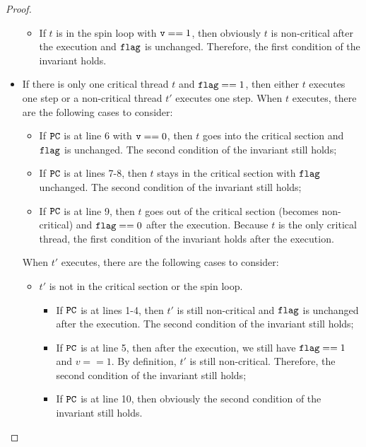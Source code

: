 \documentclass{article}[10pt]
\newcommand{\kwd}[1]{\ensuremath{\text{\ttfamily #1}}\xspace}
\def\kflag{\kwd{flag}}
\def\kv{\kwd{v}}
\begin{document}
\begin{proof}
\begin{itemize}
\begin{itemize}
\begin{itemize}
      \end{itemize}


    \item If $t$ is in the spin loop with $\kv == 1$, then obviously
      $t$ is non-critical after the execution and $\kflag$ is
      unchanged. Therefore, the first condition of the invariant
      holds.

    \end{itemize}
    
  \item If there is only one critical thread $t$ and $\kflag == 1$,
    then either $t$ executes one step or a non-critical thread $t'$
    executes one step. When $t$ executes, there are the following
    cases to consider:
    \begin{itemize}
    \item If \kwd{PC} is at line 6 with $\kv == 0$, then $t$ goes into
      the critical section and \kflag is unchanged. The second
      condition of the invariant still holds;

    \item If \kwd{PC} is at lines 7-8, then $t$ stays in the critical
      section with \kflag unchanged. The second condition of the
      invariant still holds;

    \item If \kwd{PC} is at line 9, then $t$ goes out of the critical
      section (becomes non-critical) and $\kflag == 0$ after
      the execution. Because $t$ is the only critical thread, the first
      condition of the invariant holds after the execution.
    \end{itemize}
    When $t'$ executes, there are the following cases to consider:
    \begin{itemize}
    \item $t'$ is not in the critical section or the spin loop. 
      \begin{itemize}
      \item If \kwd{PC} is at lines 1-4, then $t'$ is still
        non-critical and \kflag is unchanged after the execution. The
        second condition of the invariant still holds;

      \item If \kwd{PC} is at line 5, then after the execution, we
        still have $\kflag == 1$ and $v == 1$. By definition, $t'$ is
        still non-critical. Therefore, the second condition of the
        invariant still holds;

      \item If \kwd{PC} is at line 10, then obviously the second
        condition of the invariant still holds.


\end{itemize}
\end{itemize}
\end{itemize}
\end{proof}
\end{document}
